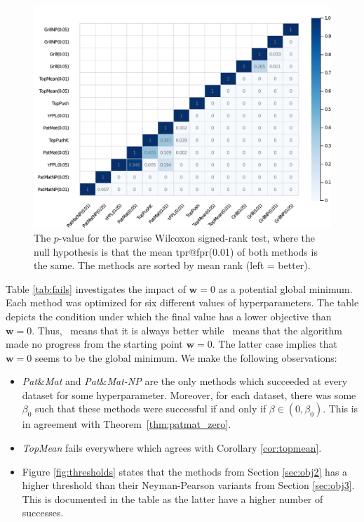 \documentclass[]{interact}
\theoremstyle{plain}%
\theoremstyle{definition}
\theoremstyle{remark}
\newcommand{\cmark}{{\color{mygreen} \ding{51}}}%
\newcommand{\xmark}{{\color{myred} \ding{55}}}
\newcommand{\toppush}{\emph{TopPush}\xspace}
\newcommand{\toppushk}{\emph{TopPushK}\xspace}
\newcommand{\patmat}{\emph{Pat}\&\emph{Mat}\xspace}
\newcommand{\topmeank}{\emph{TopMean}\xspace}
\newcommand{\npB}{{\emph{Pat}\&\emph{Mat-NP}}\xspace}
\newcommand{\npC}{{\emph{$\tau$-FPL}}\xspace}
\begin{document}
\begin{figure}[!ht]
    \centering
    \includegraphics[width = \linewidth]{figures/wilcoxon_fpr_1.pdf}
    \caption{The $p$-value for the parwise Wilcoxon signed-rank test, where the null hypothesis is that the mean tpr@fpr(0.01) of both methods is the same. The methods are sorted by mean rank (left = better).}
    \label{fig:wilcoxon}
\end{figure}

Table \ref{tab:fails} investigates the impact of $\bm w=0$ as a potential global minimum. Each method was optimized for six different values of hyperparameters. The table depicts the condition under which the final value has a lower objective than $\bm w=0$. Thus, \cmark\ means that it is always better while \xmark\ means that the algorithm made no progress from the starting point $\bm w =0$. The latter case implies that $\bm w=0$ seems to be the global minimum. We make the following observations:
\begin{itemize}\itemsep 0pt
\item \patmat and \npB are the only methods which succeeded at every dataset for some hyperparameter. Moreover, for each dataset, there was some $\beta_0$ such that these methods were successful if and only if $\beta\in(0,\beta_0)$. This is in agreement with Theorem~\ref{thm:patmat_zero}.
\item \topmeank fails everywhere which agrees with Corollary \ref{cor:topmean}.
\item Figure \ref{fig:thresholds} states that the methods from Section \ref{sec:obj2} has a higher threshold than their Neyman-Pearson variants from Section \ref{sec:obj3}. This is documented in the table as the latter have a higher number of successes.
\end{itemize}
\end{document}
